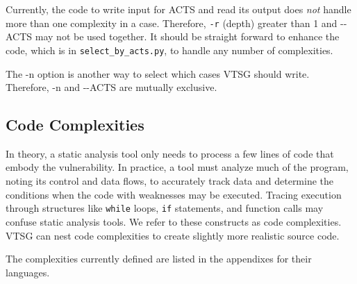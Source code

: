 \documentclass[12pt]{article}
\newcommand{\zws}{\hspace{0pt}}
\begin{document}
Currently, the code to write input for ACTS and read its output does \emph{not}
handle more than one complexity in a case.  Therefore, \verb|-r| (depth) greater
than 1 and
-\zws-ACTS may not be used together.  It should be straight forward to enhance
the code, which is in \verb|select_by_acts.py|, to handle any number of
complexities.

The -n option is another way to select which cases VTSG should write.
Therefore, -n and -\zws-ACTS are mutually exclusive.

\subsection{Code Complexities}
\label{sec:code complexities}

In theory, a static analysis tool only needs to process a few lines of
code that
embody the vulnerability. In practice, a tool must analyze much
of the program,
noting its control and data flows, to accurately track data and
determine the
conditions when the code with weaknesses may be executed.
Tracing execution through structures like \verb|while| loops, \verb|if|
statements, and function calls may confuse static analysis tools.
We refer to these constructs as code complexities.
VTSG can nest code complexities to create slightly more realistic source code.

The complexities currently defined
are listed in the appendixes for their languages.
\end{document}
